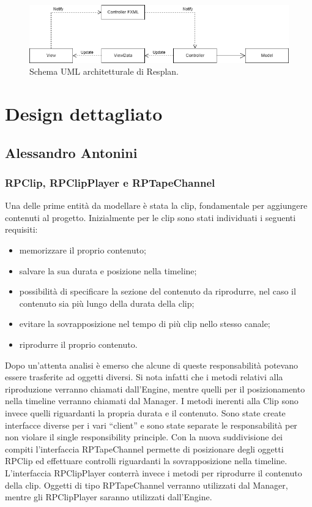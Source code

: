 \documentclass[a4paper,12pt]{report}
\begin{document}
\begin{figure}[h]
\centering{}
\includegraphics[width=\textwidth]{img/arch.png}
\caption{Schema UML architetturale di Resplan.}
\end{figure}

\section{Design dettagliato}

\subsection{Alessandro Antonini}

\subsubsection{RPClip, RPClipPlayer e RPTapeChannel}
Una delle prime entità da modellare è stata la clip, fondamentale per aggiungere contenuti al progetto.
Inizialmente per le clip sono stati individuati i seguenti requisiti: 
\begin{itemize}
    \item memorizzare il proprio contenuto;
    \item salvare la sua durata e posizione nella timeline;
    \item possibilità di specificare la sezione del contenuto da riprodurre, nel caso il contenuto sia più lungo della durata della clip;
    \item evitare la sovrapposizione nel tempo di più clip nello stesso canale;
    \item riprodurre il proprio contenuto.
\end{itemize}

Dopo un’attenta analisi è emerso che alcune di queste responsabilità potevano essere trasferite ad oggetti diversi. 
Si nota infatti che i metodi relativi alla riproduzione verranno chiamati dall’Engine, mentre quelli per il posizionamento nella timeline verranno chiamati dal Manager.
I metodi inerenti alla Clip sono invece quelli riguardanti la propria durata e il contenuto.
Sono state create interfacce diverse per i vari “client” e sono state separate le responsabilità per non violare il single responsibility principle.
Con la nuova suddivisione dei compiti l’interfaccia RPTapeChannel permette di posizionare degli oggetti RPClip ed effettuare controlli riguardanti la sovrapposizione nella timeline.
L’interfaccia RPClipPlayer conterrà invece i metodi per riprodurre il contenuto della clip.
Oggetti di tipo RPTapeChannel verranno utilizzati dal Manager, mentre gli RPClipPlayer saranno utilizzati dall’Engine.
\endsubsubsection
\end{document}
